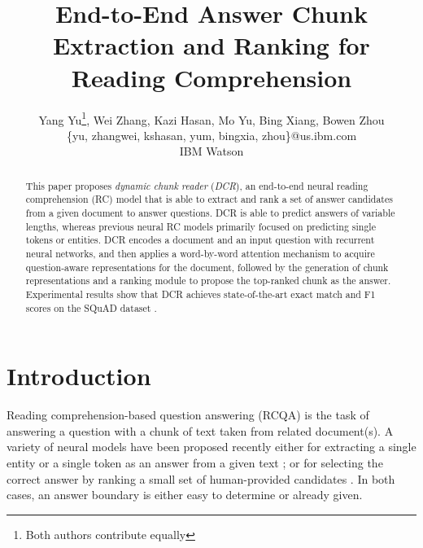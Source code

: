 \documentclass[letterpaper]{article}
\newcommand*\samethanks[1][\value{footnote}]{\footnotemark[#1]}
\begin{document}
\title{End-to-End Answer Chunk Extraction and Ranking for Reading Comprehension}
\author{
Yang Yu\thanks{Both authors contribute equally}, Wei Zhang\samethanks, Kazi Hasan, Mo Yu, Bing Xiang, Bowen Zhou\\
\{yu, zhangwei, kshasan, yum, bingxia, zhou\}@us.ibm.com\\
IBM Watson
}

\maketitle
\begin{abstract}



This paper proposes {\it dynamic chunk reader} ({\it DCR}), an end-to-end neural reading comprehension (RC) model that is able to extract and rank a set of answer candidates from a given document to answer questions. DCR is able to predict answers of variable lengths, whereas previous neural RC models primarily focused on predicting single tokens or entities. DCR encodes a document and an input question with recurrent neural networks, and then applies a word-by-word attention mechanism to acquire question-aware representations for the document, followed by the generation of chunk representations and a ranking module to propose the top-ranked chunk as the answer. Experimental results show that DCR achieves state-of-the-art exact match and F1 scores on the SQuAD dataset \cite{rajpurkar2016squad}.










\end{abstract}

\section{Introduction}

Reading comprehension-based question answering (RCQA) is the task of answering a question with a chunk of text taken from related document(s). A variety of neural models have been proposed recently either for extracting a single entity or a single token as an answer from a given text \cite{hermann2015teaching,kadlec2016text,trischler2016natural,dhingra2016gated,chen2016thorough,sordoni2016iterative,cui2016aoa}; or for selecting the correct answer by ranking a small set of human-provided candidates \cite{yin2016attention,trischler2016parallel}. In both cases, an answer boundary is either easy to determine or already given.
\end{document}
